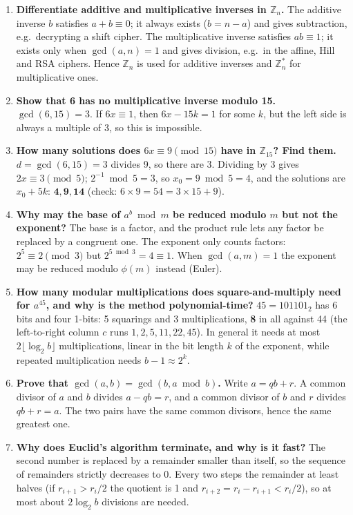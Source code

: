 \begin{enumerate}[leftmargin=1.6em,itemsep=3pt]
  \item \textbf{Differentiate additive and multiplicative inverses in $\mathbb{Z}_n$.} The additive inverse $b$ satisfies $a + b \equiv 0$; it always exists ($b = n - a$) and gives subtraction, e.g.\ decrypting a shift cipher. The multiplicative inverse satisfies $ab \equiv 1$; it exists only when $\gcd(a, n) = 1$ and gives division, e.g.\ in the affine, Hill and RSA ciphers. Hence $\mathbb{Z}_n$ is used for additive inverses and $\mathbb{Z}_n^*$ for multiplicative ones.
  \item \textbf{Show that 6 has no multiplicative inverse modulo 15.} $\gcd(6, 15) = 3$. If $6x \equiv 1$, then $6x - 15k = 1$ for some $k$, but the left side is always a multiple of 3, so this is impossible.
  \item \textbf{How many solutions does $6x \equiv 9 \pmod{15}$ have in $\mathbb{Z}_{15}$? Find them.} $d = \gcd(6, 15) = 3$ divides 9, so there are 3. Dividing by 3 gives $2x \equiv 3 \pmod 5$; $2^{-1} \bmod 5 = 3$, so $x_0 = 9 \bmod 5 = 4$, and the solutions are $x_0 + 5k$: $\mathbf{4, 9, 14}$ (check: $6 \times 9 = 54 = 3 \times 15 + 9$).
  \item \textbf{Why may the base of $a^b \bmod m$ be reduced modulo $m$ but not the exponent?} The base is a factor, and the product rule lets any factor be replaced by a congruent one. The exponent only counts factors: $2^5 \equiv 2 \pmod 3$ but $2^{5 \bmod 3} = 4 \equiv 1$. When $\gcd(a, m) = 1$ the exponent may be reduced modulo $\phi(m)$ instead (Euler).
  \item \textbf{How many modular multiplications does square-and-multiply need for $a^{45}$, and why is the method polynomial-time?} $45 = 101101_2$ has 6 bits and four 1-bits: 5 squarings and 3 multiplications, \textbf{8} in all against 44 (the left-to-right column $c$ runs $1, 2, 5, 11, 22, 45$). In general it needs at most $2\lfloor\log_2 b\rfloor$ multiplications, linear in the bit length $k$ of the exponent, while repeated multiplication needs $b - 1 \approx 2^k$.
  \item \textbf{Prove that $\gcd(a, b) = \gcd(b, a \bmod b)$.} Write $a = qb + r$. A common divisor of $a$ and $b$ divides $a - qb = r$, and a common divisor of $b$ and $r$ divides $qb + r = a$. The two pairs have the same common divisors, hence the same greatest one.
  \item \textbf{Why does Euclid's algorithm terminate, and why is it fast?} The second number is replaced by a remainder smaller than itself, so the sequence of remainders strictly decreases to 0. Every two steps the remainder at least halves (if $r_{i+1} > r_i/2$ the quotient is 1 and $r_{i+2} = r_i - r_{i+1} < r_i/2$), so at most about $2\log_2 b$ divisions are needed.

\end{enumerate}
